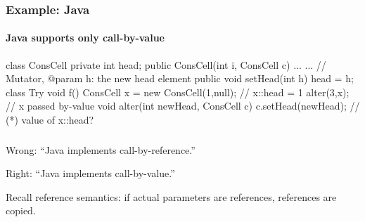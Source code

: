 \documentclass{beamer}
\begin{document}
\begin{frame}[fragile]
\frametitle{Example: Java}
\framesubtitle{Java supports only call-by-value}
%
\vspace*{-0.3cm}
\begin{cplus3}
class ConsCell {
    private int head;    
    public ConsCell(int i, ConsCell c) {...}
    ...
    // Mutator, @param h: the new head element
    public void setHead(int h) {
       head = h;
}}
class Try {
    void f() {
       ConsCell x = new ConsCell(1,null);  // x::head = 1
       alter(3,x);                         // x passed by-value 
    }
    void alter(int newHead, ConsCell c) {  
       c.setHead(newHead);                // (*) value of x::head?
}}
\end{cplus3}

\centerline{
}
\end{frame}




\begin{frame}[fragile]
\frametitle{}
\framesubtitle{}
\Large{
\begin{center}
Wrong: ``Java implements call-by-reference.''

Right: ``Java implements call-by-value.'' \\
\end{center}
{\small Recall reference semantics: if actual parameters are references,
references are copied. 
}
}
\end{frame}
\end{document}
